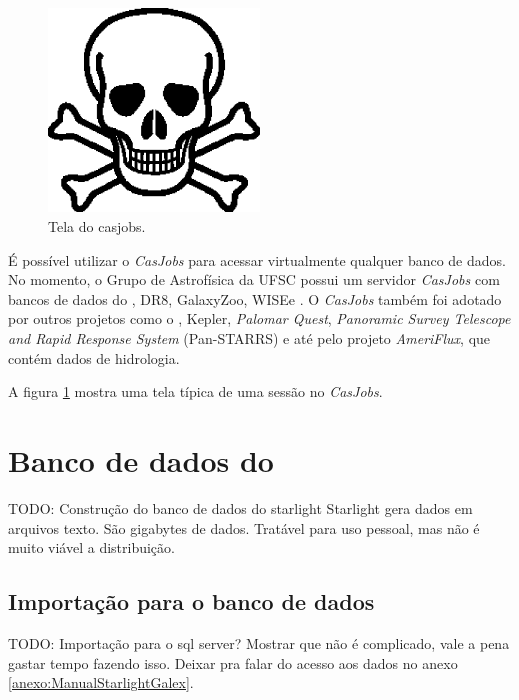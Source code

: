 \begin{figure}
	\includegraphics[width=0.5\textwidth]{figuras/test.eps}
	\caption[Tela do casjobs]
	{Tela do casjobs.}
	\label{fig:CasJobs}
\end{figure}

É possível utilizar o {\em CasJobs} para acessar virtualmente qualquer banco de
dados. No momento, o Grupo de Astrofísica da UFSC possui um servidor {\em
CasJobs} com bancos de dados do \starlight, \SDSS DR8, GalaxyZoo\citneed,
WISE\citneed e \galex. O {\em CasJobs} também foi adotado por outros projetos
como o \galex, Kepler\citneed, {\em Palomar Quest}\citneed, {\em Panoramic
Survey Telescope and Rapid Response System} (Pan-STARRS) e até pelo projeto {\em
AmeriFlux}, que contém dados de hidrologia\citneed.

A figura \ref{fig:CasJobs} mostra uma tela típica de uma sessão no {\em
CasJobs}.

\section{Banco de dados do \starlight}
TODO: Construção do banco de dados do starlight Starlight gera dados em arquivos
texto. São gigabytes de dados. Tratável para uso pessoal, mas não é muito viável
a distribuição.

\subsection{Importação para o banco de dados}
TODO: Importação para o sql server? Mostrar que não é complicado, vale a pena
gastar tempo fazendo isso. Deixar pra falar do acesso aos dados no anexo
\ref{anexo:ManualStarlightGalex}.

